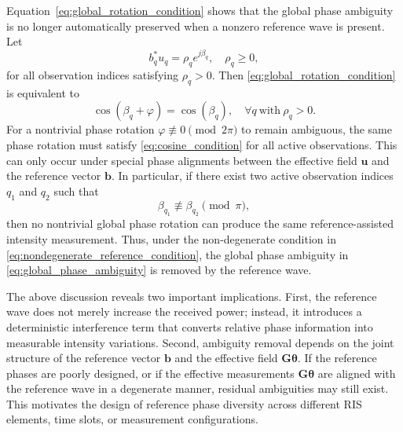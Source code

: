 \documentclass[journal]{IEEEtran}
\begin{document}
Equation~\eqref{eq:global_rotation_condition} shows that the global phase ambiguity is no longer automatically preserved when a nonzero reference wave is present. 
Let
\begin{equation}
b_q^*u_q
=
\rho_q e^{j\beta_q},
\quad
\rho_q\geq 0,
\end{equation}
for all observation indices satisfying $\rho_q>0$. 
Then \eqref{eq:global_rotation_condition} is equivalent to
\begin{equation}
\cos(\beta_q+\varphi)
=
\cos(\beta_q),
\quad
\forall q \ \text{with} \ \rho_q>0.
\label{eq:cosine_condition}
\end{equation}
For a nontrivial phase rotation $\varphi\not\equiv 0 \pmod{2\pi}$ to remain ambiguous, the same phase rotation must satisfy \eqref{eq:cosine_condition} for all active observations. 
This can only occur under special phase alignments between the effective field $\mathbf{u}$ and the reference vector $\mathbf{b}$. 
In particular, if there exist two active observation indices $q_1$ and $q_2$ such that
\begin{equation}
\beta_{q_1}
\not\equiv
\beta_{q_2}
\pmod{\pi},
\label{eq:nondegenerate_reference_condition}
\end{equation}
then no nontrivial global phase rotation can produce the same reference-assisted intensity measurement. 
Thus, under the non-degenerate condition in \eqref{eq:nondegenerate_reference_condition}, the global phase ambiguity in \eqref{eq:global_phase_ambiguity} is removed by the reference wave.

The above discussion reveals two important implications. 
First, the reference wave does not merely increase the received power; instead, it introduces a deterministic interference term that converts relative phase information into measurable intensity variations. 
Second, ambiguity removal depends on the joint structure of the reference vector $\mathbf{b}$ and the effective field $\mathbf{G}\boldsymbol{\theta}$. 
If the reference phases are poorly designed, or if the effective measurements $\mathbf{G}\boldsymbol{\theta}$ are aligned with the reference wave in a degenerate manner, residual ambiguities may still exist. 
This motivates the design of reference phase diversity across different RIS elements, time slots, or measurement configurations.
\end{document}
